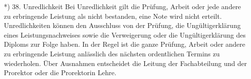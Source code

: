 \vspace{2cm}



\begin{singlespace}
\textsf{\tiny{*)  38. Unredlichkeit
Bei Unredlichkeit gilt die Prüfung, Arbeit oder jede andere zu erbringende Leistung als nicht bestanden, eine Note  wird nicht erteilt. Unredlichkeiten können den Ausschluss von der Prüfung, die Ungültigerklärung eines Leistungsnachweises sowie die Verweigerung oder die Ungültigerklärung des Diploms zur Folge haben.
In der Regel ist die ganze Prüfung, Arbeit oder andere zu erbringende Leistung anlässlich des nächsten ordentlichen Termins zu wiederholen. Über Ausnahmen entscheidet die Leitung der Fachabteilung und der Prorektor oder die Prorektorin Lehre.}}
\end{singlespace}

